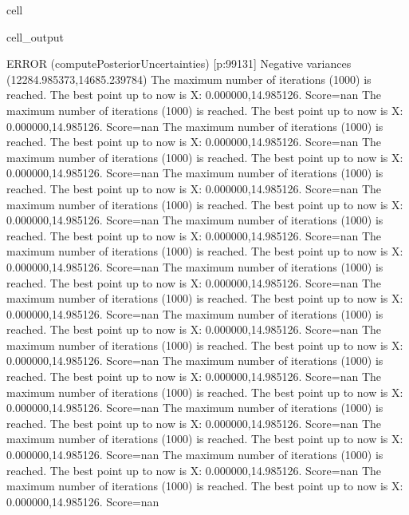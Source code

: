 \documentclass[letterpaper,10pt,english]{jupyterBook}
\begin{document}
\begin{sphinxuseclass}{cell}
\begin{sphinxVerbatimOutput}
\begin{sphinxuseclass}{cell_output}
\begin{sphinxVerbatim}[commandchars=\\\{\}]
ERROR (compute\PYGZus{}Posterior\PYGZus{}Uncertainties) [p:99131] Negative variances (\PYGZhy{}12284.985373,\PYGZhy{}14685.239784)
The maximum number of iterations (1000) is reached. The best point up to now is X: \PYGZob{}0.000000,14.985126\PYGZcb{}. Score=\PYGZhy{}nan
The maximum number of iterations (1000) is reached. The best point up to now is X: \PYGZob{}0.000000,14.985126\PYGZcb{}. Score=\PYGZhy{}nan
The maximum number of iterations (1000) is reached. The best point up to now is X: \PYGZob{}0.000000,14.985126\PYGZcb{}. Score=\PYGZhy{}nan
The maximum number of iterations (1000) is reached. The best point up to now is X: \PYGZob{}0.000000,14.985126\PYGZcb{}. Score=\PYGZhy{}nan
The maximum number of iterations (1000) is reached. The best point up to now is X: \PYGZob{}0.000000,14.985126\PYGZcb{}. Score=\PYGZhy{}nan
The maximum number of iterations (1000) is reached. The best point up to now is X: \PYGZob{}0.000000,14.985126\PYGZcb{}. Score=\PYGZhy{}nan
The maximum number of iterations (1000) is reached. The best point up to now is X: \PYGZob{}0.000000,14.985126\PYGZcb{}. Score=\PYGZhy{}nan
The maximum number of iterations (1000) is reached. The best point up to now is X: \PYGZob{}0.000000,14.985126\PYGZcb{}. Score=\PYGZhy{}nan
The maximum number of iterations (1000) is reached. The best point up to now is X: \PYGZob{}0.000000,14.985126\PYGZcb{}. Score=\PYGZhy{}nan
The maximum number of iterations (1000) is reached. The best point up to now is X: \PYGZob{}0.000000,14.985126\PYGZcb{}. Score=\PYGZhy{}nan
The maximum number of iterations (1000) is reached. The best point up to now is X: \PYGZob{}0.000000,14.985126\PYGZcb{}. Score=\PYGZhy{}nan
The maximum number of iterations (1000) is reached. The best point up to now is X: \PYGZob{}0.000000,14.985126\PYGZcb{}. Score=\PYGZhy{}nan
The maximum number of iterations (1000) is reached. The best point up to now is X: \PYGZob{}0.000000,14.985126\PYGZcb{}. Score=\PYGZhy{}nan
The maximum number of iterations (1000) is reached. The best point up to now is X: \PYGZob{}0.000000,14.985126\PYGZcb{}. Score=\PYGZhy{}nan
The maximum number of iterations (1000) is reached. The best point up to now is X: \PYGZob{}0.000000,14.985126\PYGZcb{}. Score=\PYGZhy{}nan
The maximum number of iterations (1000) is reached. The best point up to now is X: \PYGZob{}0.000000,14.985126\PYGZcb{}. Score=\PYGZhy{}nan
The maximum number of iterations (1000) is reached. The best point up to now is X: \PYGZob{}0.000000,14.985126\PYGZcb{}. Score=\PYGZhy{}nan
The maximum number of iterations (1000) is reached. The best point up to now is X: \PYGZob{}0.000000,14.985126\PYGZcb{}. Score=\PYGZhy{}nan

\end{sphinxVerbatim}
\end{sphinxuseclass}
\end{sphinxVerbatimOutput}
\end{sphinxuseclass}
\end{document}
